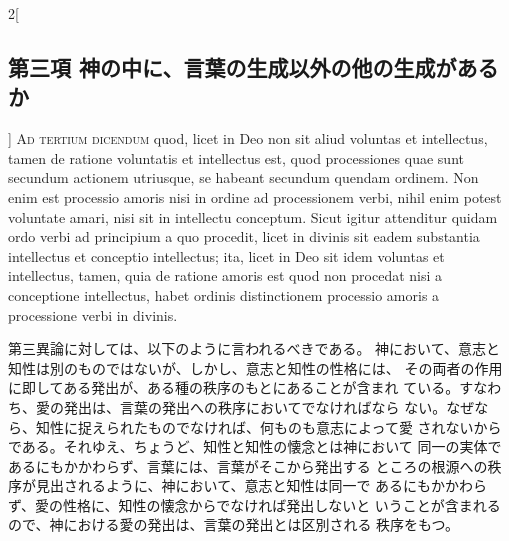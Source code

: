 \documentclass[paper=a4paper,fontsize=10pt,jafontsize=9pt,titlepage]{jlreq}
\begin{document}
\begin{paracol}{2}[\subsection{第三項 神の中に、言葉の生成以外の他の生成があるか}]
{\scshape Ad tertium dicendum} quod, licet in Deo non sit aliud voluntas et
intellectus, tamen de ratione voluntatis et intellectus est, quod
processiones quae sunt secundum actionem utriusque, se habeant secundum
quendam ordinem. Non enim est processio amoris nisi in ordine ad
processionem verbi, nihil enim potest voluntate amari, nisi sit in
intellectu conceptum. Sicut igitur attenditur quidam ordo verbi ad
principium a quo procedit, licet in divinis sit eadem substantia
intellectus et conceptio intellectus; ita, licet in Deo sit idem
voluntas et intellectus, tamen, quia de ratione amoris est quod non
procedat nisi a conceptione intellectus, habet ordinis distinctionem
processio amoris a processione verbi in divinis.


\switchcolumn


第三異論に対しては、以下のように言われるべきである。
神において、意志と知性は別のものではないが、しかし、意志と知性の性格には、
 その両者の作用に即してある発出が、ある種の秩序のもとにあることが含まれ
 ている。すなわち、愛の発出は、言葉の発出への秩序においてでなければなら
 ない。なぜなら、知性に捉えられたものでなければ、何ものも意志によって愛
 されないからである。それゆえ、ちょうど、知性と知性の懐念とは神において
 同一の実体であるにもかかわらず、言葉には、言葉がそこから発出する
 ところの根源への秩序が見出されるように、神において、意志と知性は同一で
 あるにもかかわらず、愛の性格に、知性の懐念からでなければ発出しないと
 いうことが含まれるので、神における愛の発出は、言葉の発出とは区別される
 秩序をもつ。


\switchcolumn*



\end{paracol}
\newpage


\end{document}
